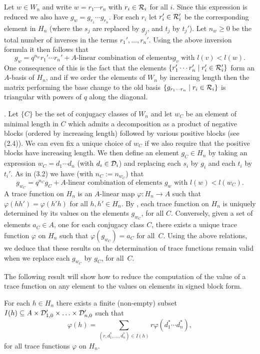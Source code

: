 Let $w \in W_n$ and write $w=r_1 \cdots r_n$ with $r_i \in {\cal R}_i$
for  all $i$. Since this expression is reduced we also have $g_w=
g_{r_1} \cdots g_{r_n}$. For  each $r_i$ let   $r_i' \in {\cal  R}_i'$  be 
the corresponding element in $H_n$ (where the $s_j$ are replaced by $g_j$,
and $t_j$  by   $t_j'$).  Let $n_w  \geq  0$  be the   total number of
inverses in the   terms $r_1',\ldots,r_n'$. Using  the above inversion
formula it then follows that
\[ g_w=q^{n_w}r_1' \cdots r_n'+ \mbox{$A$-linear combination of elements
$g_v$ with $l(v) < l(w)$}.\] One consequence of this  is the fact that
the elements $\{r_1' \cdots r_n' \mid r_i' \in  {\cal R}_i'\}$ form an
$A$-basis of   $H_n$,  and if   we order  the   elements of  $W_n$  by
increasing  length then the matrix  performing the base  change to the
old  basis $\{ g_{r_1    \cdots r_n} \mid   r_i  \in {\cal  R}_i\}$ is
triangular with powers of $q$ along the diagonal.

. Let $\{C\}$ be the set of conjugacy classes of $W_n$ and let $w_C$ be 
an element of minimal length in $C$ which admits a decomposition as a 
product of negative blocks (ordered by increasing length) followed
by various positive blocks (see (2.4)). We can even fix a unique choice
of $w_C$ if we also require that the positive blocks  have increasing 
length. We then define an element $g_C \in  H_n$ by taking an
expression $w_C=d_1 \cdots d_n$ (with $d_i \in {\cal D}_i$) and replacing 
each  $s_i$ by  $g_i$ and each $t_i$ by $t_i'$.  As in (3.2) we have (with 
$n_C:=n_{w_C}$) that
\[ g_{w_C} =q^{n_C}g_{C}+   \mbox{$A$-linear combination of elements $g_w$ 
with $l(w)<l(w_C)$}.\] 
A  trace  function   on $H_n$   is  an  $A$-linear  map   $\varphi:H_n
\rightarrow  A$ such that  $\varphi(h h')=\varphi(h' h)$ for all $h,h'
\in   H_n$.  By \cite{GP}, each trace   function  on $H_n$ is uniquely
determined  by  its   values   on  the  elements   $g_{w_C}$,  for all
$C$. Conversely, given  a set  of elements  $a_C \in A$,  one for each
conjugacy class $C$, there exists a unique trace function $\varphi$ on
$H_n$ such that $\varphi(g_{w_C})=a_C$ for all~$C$.  Using the above 
relations, we deduce that these results on the determination of trace 
functions  remain valid when we replace each $g_{w_C}$ by $g_C$, for all~$C$.

The following result will show how to reduce the computation of the value
of a  trace function  on any element to the values on elements in signed
block form.

\addtocounter{thm}{3}
\begin{prop}
For each $h \in  H_n$ there exists a  finite (non-empty) subset  $I(h)
\subseteq   A  \times  {\cal  D}_{1,0}'  \times   \ldots \times  {\cal
D}_{n,0}'$ such that \[\varphi(h) =   \sum_{(r,d_1^{*},\ldots,d_n^{*})
\in I(h)} r \varphi(d_1^{*} \cdots d_n^{*}),\] for all trace functions
$\varphi$ on $H_n$.
\end{prop}

